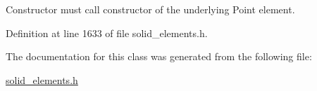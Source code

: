 Constructor must call constructor of the underlying Point element. 



Definition at line 1633 of file solid\+\_\+elements.\+h.



The documentation for this class was generated from the following file\+:\begin{DoxyCompactItemize}
\item 
\hyperlink{solid__elements_8h}{solid\+\_\+elements.\+h}\end{DoxyCompactItemize}
